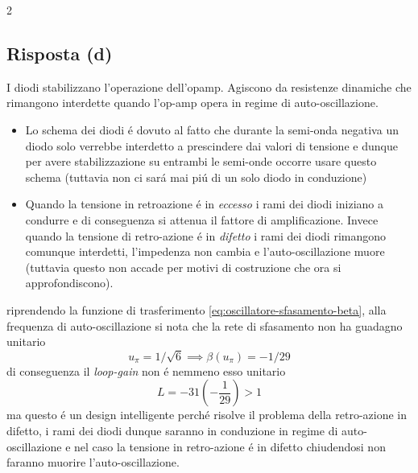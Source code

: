 \begin{multicols}{2}
  \subsection*{Risposta (d)}
  I diodi stabilizzano l'operazione dell'opamp. Agiscono da resistenze dinamiche che rimangono interdette
  quando l'op-amp opera in regime di auto-oscillazione.
  \begin{itemize}
  \item
    Lo schema dei diodi \'e dovuto al fatto che durante la semi-onda negativa un diodo solo verrebbe
    interdetto a prescindere dai valori di tensione e dunque per avere stabilizzazione su entrambi le
    semi-onde occorre usare questo schema (tuttavia non ci sar\'a mai pi\'u di un solo diodo in conduzione)
  \item
    Quando la tensione in retroazione \'e in \textit{eccesso} i rami dei diodi iniziano a condurre e di conseguenza
    si attenua il fattore di amplificazione. Invece quando la tensione di retro-azione \'e in \textit{difetto} i rami
    dei diodi rimangono comunque interdetti, l'impedenza non cambia e l'auto-oscillazione muore (tuttavia
    questo non accade per motivi di costruzione che ora si approfondiscono).
  \end{itemize}
  riprendendo la funzione di trasferimento \ref{eq:oscillatore-sfasamento-beta}, alla frequenza di
  auto-oscillazione si nota che la rete di sfasamento non ha guadagno unitario
  \begin{equation*}
    u_{\pi} = 1/\sqrt6 \implies \beta(u_{\pi}) = -1/29
  \end{equation*}
  di conseguenza il \textit{loop-gain} non \'e nemmeno esso unitario
  \begin{equation*}
    L = -31\left(-\frac{1}{29}\right) > 1
  \end{equation*}
  ma questo \'e un design intelligente perch\'e risolve il problema della retro-azione in difetto, i rami dei
  diodi dunque saranno in conduzione in regime di auto-oscillazione e nel caso la tensione in retro-azione \'e in
  difetto chiudendosi non faranno muorire l'auto-oscillazione.
\end{multicols}
